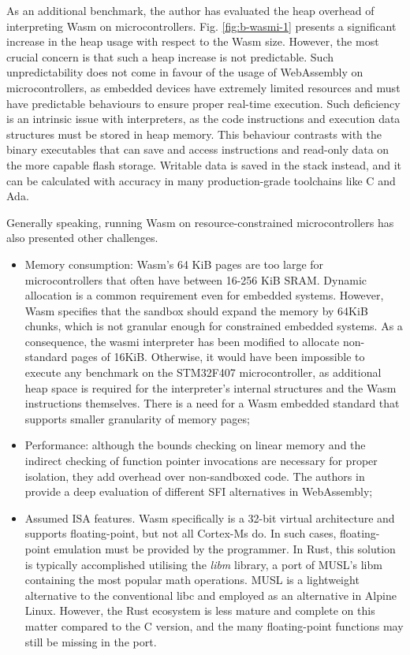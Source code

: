 As an additional benchmark, the author has evaluated the heap overhead of interpreting Wasm on microcontrollers. Fig. \ref{fig:b-wasmi-1} presents a significant increase in the heap usage with respect to the Wasm size. However, the most crucial concern is that such a heap increase is not predictable. Such unpredictability does not come in favour of the usage of WebAssembly on microcontrollers, as embedded devices have extremely limited resources and must have predictable behaviours to ensure proper real-time execution. Such deficiency is an intrinsic issue with interpreters, as the code instructions and execution data structures must be stored in heap memory. This behaviour contrasts with the binary executables that can save and access instructions and read-only data on the more capable flash storage. Writable data is saved in the stack instead, and it can be calculated with accuracy in many production-grade toolchains like C and Ada.

Generally speaking, running Wasm on resource-constrained microcontrollers has also presented other challenges.

\begin{itemize}
    \item Memory consumption: Wasm's 64 KiB pages are too large for microcontrollers that often have between 16-256 KiB SRAM. Dynamic allocation is a common requirement even for embedded systems. However, Wasm specifies that the sandbox should expand the memory by 64KiB chunks, which is not granular enough for constrained embedded systems. As a consequence, the wasmi interpreter has been modified to allocate non-standard pages of 16KiB. Otherwise, it would have been impossible to execute any benchmark on the STM32F407 microcontroller, as additional heap space is required for the interpreter's internal structures and the Wasm instructions themselves. There is a need for a Wasm embedded standard that supports smaller granularity of memory pages;
    \item Performance: although the bounds checking on linear memory and the indirect checking of function pointer invocations are necessary for proper isolation, they add overhead over non-sandboxed code. The authors in \cite{ewasm} provide a deep evaluation of different SFI alternatives in WebAssembly;
    \item Assumed ISA features. Wasm specifically is a 32-bit virtual architecture and supports floating-point, but not all Cortex-Ms do. In such cases, floating-point emulation must be provided by the programmer. In Rust, this solution is typically accomplished utilising the \emph{libm} library, a port of MUSL's libm containing the most popular math operations. MUSL is a lightweight alternative to the conventional libc and employed as an alternative in Alpine Linux. However, the Rust ecosystem is less mature and complete on this matter compared to the C version, and the many floating-point functions may still be missing in the port. 
\end{itemize}

